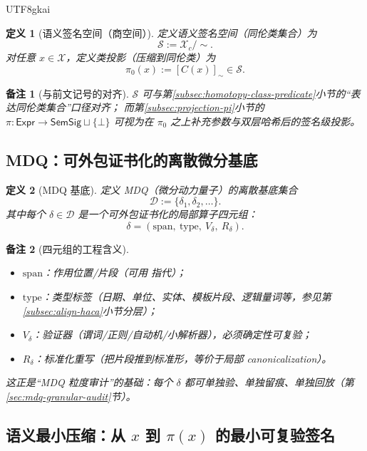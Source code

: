 \documentclass[12pt]{article}
\newtheorem{definition}{定义}[section]
\newtheorem{remark}{备注}[section]
\newcommand{\code}[1]{\path{#1}}
\begin{document}
\begin{CJK*}{UTF8}{gkai}
\begin{definition}[语义签名空间（商空间）]
定义语义签名空间（同伦类集合）为
\[
\mathcal{S}:=\mathcal{X}_c/\sim.
\]
对任意 $x\in\mathcal{X}$，定义类投影（压缩到同伦类）为
\[
\pi_0(x):=[C(x)]_{\sim}\in \mathcal{S}.
\]
\end{definition}

\begin{remark}[与前文记号的对齐]
$\mathcal{S}$ 可与第\ref{subsec:homotopy-class-predicate}小节的“表达同伦类集合”口径对齐；
而第\ref{subsec:projection-pi}小节的 $\pi:\mathsf{Expr}\to\mathsf{SemSig}\sqcup\{\bot\}$ 可视为在 $\pi_0$
  之上补充参数与双层哈希后的\emph{签名级投影}。
\end{remark}

\subsection{MDQ：可外包证书化的离散微分基底}
\label{subsec:mdq-basis-delta}

\begin{definition}[MDQ 基底]
定义 MDQ（微分动力量子）的离散基底集合
\[
\mathcal{D}:=\{\delta_1,\delta_2,\ldots\}.
\]
其中每个 $\delta\in\mathcal{D}$ 是一个可外包证书化的局部算子四元组：
\[
\delta=(\mathrm{span},\ \mathrm{type},\ V_\delta,\ R_\delta).
\]
\end{definition}

\begin{remark}[四元组的工程含义]
\begin{itemize}
  \item $\mathrm{span}$：作用位置/片段（可用 \code{span_digest} 指代）；
  \item $\mathrm{type}$：类型标签（日期、单位、实体、模板片段、逻辑量词等，参见第\ref{subsec:align-haca}小节分层）；
  \item $V_\delta$：验证器（谓词/正则/自动机/小解析器），必须确定性可复验；
  \item $R_\delta$：标准化重写（把片段推到标准形，等价于局部 canonicalization）。
\end{itemize}
这正是“MDQ 粒度审计”的基础：每个 $\delta$ 都可单独验、单独留痕、单独回放（第\ref{sec:mdq-granular-audit}节）。
\end{remark}

\subsection{语义最小压缩：从 \texorpdfstring{$x$}{x} 到 \texorpdfstring{$\pi(x)$}{pi(x)} 的最小可复验签名}
\label{subsec:minimal-compression-semsig}


\end{CJK*}
\end{document}
